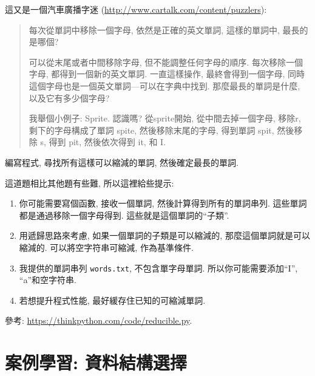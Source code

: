 \documentclass[10pt]{book}
\begin{document}
\begin{exercise}

這又是一個汽車廣播字迷
(\url{http://www.cartalk.com/content/puzzlers}):

\begin{quote}
每次從單詞中移除一個字母, 依然是正確的英文單詞, 這樣的單詞中, 
最長的是哪個?

可以從末尾或者中間移除字母, 但不能調整任何字母的順序. 
每次移除一個字母, 都得到一個新的英文單詞. 一直這樣操作, 
最終會得到一個字母, 同時這個字母也是一個英文單詞---可以在字典中找到. 
那麼最長的單詞是什麼, 以及它有多少個字母?

我舉個小例子: Sprite. 認識嗎? 從sprite開始, 從中間去掉一個字母, 移除r, 剩下的字母構成了單詞 spite, 
然後移除末尾的字母, 得到單詞 spit, 然後移除 s, 得到 pit, 然後依次得到 it, 和 I. 
\end{quote}

編寫程式, 尋找所有這樣可以縮減的單詞, 然後確定最長的單詞. 

這道題相比其他題有些難, 所以這裡給些提示:

\begin{enumerate}

\item 你可能需要寫個函數, 接收一個單詞, 然後計算得到所有的單詞串列. 
這些單詞都是通過移除一個字母得到. 這些就是這個單詞的``子類''.

\item 用遞歸思路來考慮, 如果一個單詞的子類是可以縮減的, 
那麼這個單詞就是可以縮減的. 可以將空字符串可縮減, 作為基準條件. 

\item 我提供的單詞串列 {\tt words.txt}, 不包含單字母單詞. 所以你可能需要添加``I'', ``a''和空字符串. 

\item 若想提升程式性能, 最好緩存住已知的可縮減單詞. 

\end{enumerate}

參考: \url{https://thinkpython.com/code/reducible.py}.

\end{exercise}




\chapter{案例學習: 資料結構選擇}
\end{document}
